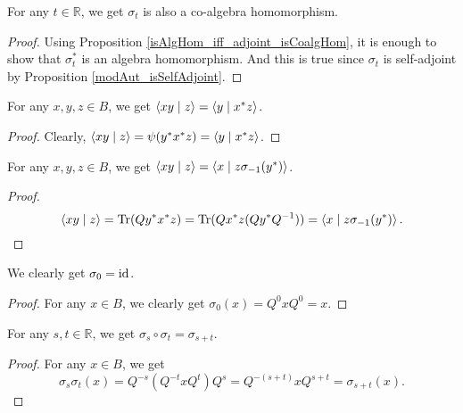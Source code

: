 \begin{corollary}\label{modAut_isCoalgHom}
  \leanok
  For any $t\in\mathbb{R}$, we get $\sigma_t$ is also a co-algebra homomorphism.
 \end{corollary}
 \begin{proof}
  \leanok
  Using Proposition \ref{isAlgHom_iff_adjoint_isCoalgHom}, it is enough to show that $\sigma_t^*$ is an algebra homomorphism. And this is true since $\sigma_t$ is self-adjoint by Proposition \ref{modAut_isSelfAdjoint}.
 \end{proof}
 
 \begin{lemma}\label{inner_star_left}
  \leanok
  For any $x,y,z\in{B}$, we get $\left\langle xy \mid z\right\rangle=\left\langle y \mid x^*z\right\rangle$.
 \end{lemma}
 \begin{proof}\leanok
  Clearly, $\left\langle xy \mid z\right\rangle=\psi(y^*x^*z)=\left\langle y \mid x^*z\right\rangle$.
 \end{proof}

 \begin{lemma}\label{inner_conj_left}
  \leanok
  For any $x,y,z\in{B}$, we get $\left\langle xy \mid z\right\rangle=\left\langle x \mid z\sigma_{-1}(y^*)\right\rangle$.
 \end{lemma}
 \begin{proof}\leanok
  \[\left\langle xy \mid z\right\rangle=\operatorname{Tr}(Q{y^*x^*}z)=\operatorname{Tr}(Qx^*z(Qy^*Q^{-1}))=\left\langle x \mid z\sigma_{-1}(y^*)\right\rangle.\]
 \end{proof}

 \begin{lemma}\label{modAut_zero}
  \leanok
  We clearly get $\sigma_0=\operatorname{id}$.
 \end{lemma}
 \begin{proof}\leanok
  For any $x\in{B}$, we clearly get $\sigma_0(x)=Q^0xQ^0=x$.
 \end{proof}

 \begin{lemma}\label{modAut_comp}
  \leanok
  For any $s,t\in\mathbb{R}$, we get $\sigma_s\circ\sigma_t=\sigma_{s+t}$.
 \end{lemma}
 \begin{proof}\leanok
  For any $x\in{B}$, we get
  \[\sigma_s\sigma_t(x)=Q^{-s}(Q^{-t}xQ^t)Q^s=Q^{-(s+t)}xQ^{s+t}=\sigma_{s+t}(x).\]
 \end{proof}


